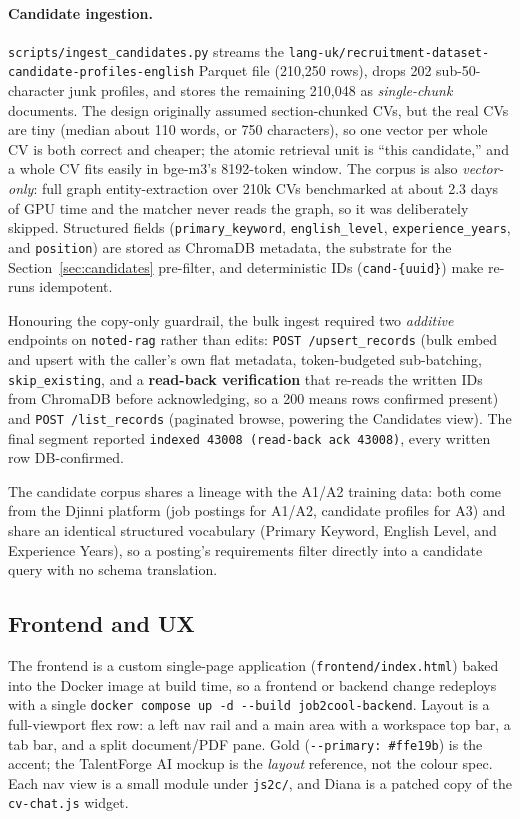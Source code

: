 \paragraph{Candidate ingestion.} \verb|scripts/ingest_candidates.py| streams the
\texttt{lang-uk/\allowbreak recruitment-dataset-\allowbreak candidate-profiles-english}
Parquet file (210,250 rows), drops 202 sub-50-character junk profiles, and stores the
remaining 210,048 as \emph{single-chunk} documents. The design originally assumed
section-chunked CVs, but the real CVs are tiny (median about 110 words, or 750 characters),
so one vector per whole CV is both correct and cheaper; the atomic retrieval unit is ``this
candidate,'' and a whole CV fits easily in bge-m3's 8192-token window. The corpus is also
\emph{vector-only}: full graph entity-extraction over 210k CVs benchmarked at about 2.3
days of GPU time and the matcher never reads the graph, so it was deliberately skipped.
Structured fields (\verb|primary_keyword|, \verb|english_level|, \verb|experience_years|,
and \verb|position|) are stored as ChromaDB metadata, the substrate for the
Section~\ref{sec:candidates} pre-filter, and deterministic IDs (\verb|cand-{uuid}|) make
re-runs idempotent.

Honouring the copy-only guardrail, the bulk ingest required two \emph{additive} endpoints
on \verb|noted-rag| rather than edits: \verb|POST /upsert_records| (bulk embed and upsert
with the caller's own flat metadata, token-budgeted sub-batching, \verb|skip_existing|, and
a \textbf{read-back verification} that re-reads the written IDs from ChromaDB before
acknowledging, so a 200 means rows confirmed present) and \verb|POST /list_records|
(paginated browse, powering the Candidates view). The final segment reported
\verb|indexed 43008 (read-back ack 43008)|, every written row DB-confirmed.

The candidate corpus shares a lineage with the A1/A2 training data: both come from the
Djinni platform (job postings for A1/A2, candidate profiles for A3) and share an identical
structured vocabulary (Primary Keyword, English Level, and Experience Years), so a
posting's requirements filter directly into a candidate query with no schema translation.

\subsection{Frontend and UX}

The frontend is a custom single-page application (\verb|frontend/index.html|) baked into
the Docker image at build time, so a frontend or backend change redeploys with a single
\texttt{docker compose up -d -{}-build job2cool-backend}. Layout is a full-viewport flex row: a
left nav rail and a main area with a workspace top bar, a tab bar, and a split document/PDF
pane. Gold (\verb|--primary: #ffe19b|) is the accent; the TalentForge AI mockup is the
\emph{layout} reference, not the colour spec. Each nav view is a small module under
\verb|js2c/|, and Diana is a patched copy of the \verb|cv-chat.js| widget.

